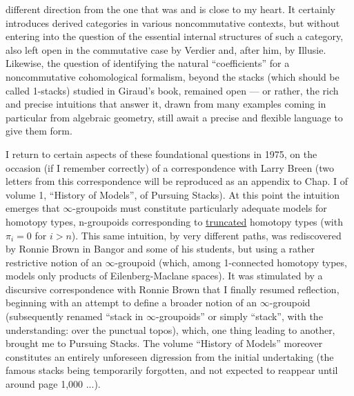 
different direction from the one that was and is close to my heart. It certainly
introduces derived categories in various noncommutative
contexts, but without entering into the question of the essential internal
structures of such a category, also left open
in the commutative case by Verdier and, after him, by Illusie. Likewise,
the question of identifying the natural ``coefficients''
for a noncommutative cohomological formalism, beyond
the stacks (which should be called 1-stacks) studied in Giraud's
book, remained open --- or rather, the rich and
precise intuitions that answer it, drawn from many examples
coming in particular from algebraic geometry, still await
a precise and flexible language to give them form.

I return to certain aspects of these foundational
questions in 1975, on the occasion (if I remember correctly) of a
correspondence with Larry Breen (two letters from this correspondence
will be reproduced as an appendix to Chap. I of volume 1,
``History of Models'', of Pursuing Stacks). At this point
the intuition emerges that $\infty$-groupoids must constitute
particularly adequate models for homotopy types,
n-groupoids corresponding to \uline{truncated} homotopy types
(with $\pi_i = 0$ for $i > n$). This same intuition, by very
different paths, was rediscovered by Ronnie Brown in Bangor and
some of his students, but using a rather restrictive notion of an $\infty$-groupoid
(which, among 1-connected homotopy types,
models only products of Eilenberg-Maclane spaces). It was
stimulated by a discursive correspondence with Ronnie Brown
that I finally resumed reflection, beginning with an attempt
to define a broader notion of an $\infty$-groupoid (subsequently renamed
``stack in $\infty$-groupoids'' or simply ``stack'', with the
understanding: over the punctual topos), which, one thing leading to another,
brought me to Pursuing Stacks. The volume ``History of Models''
moreover constitutes an entirely unforeseen digression
from the initial undertaking (the famous stacks being temporarily
forgotten, and not expected to reappear until around
page 1,000 ...).

